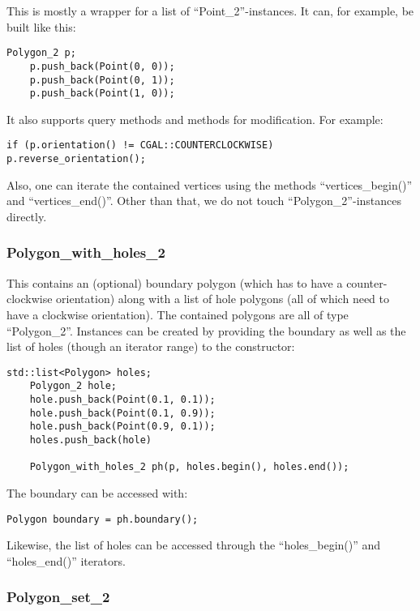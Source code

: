 This is mostly a wrapper for a list of ``Point\_2''-instances. It can, for example, be built like this:

\begin{lstlisting}[numbers=none]
    Polygon_2 p;
    p.push_back(Point(0, 0));
    p.push_back(Point(0, 1));
    p.push_back(Point(1, 0));
\end{lstlisting}

It also supports query methods and methods for modification. For example:

\begin{lstlisting}[numbers=none]
    if (p.orientation() != CGAL::COUNTERCLOCKWISE) p.reverse_orientation();
\end{lstlisting}

Also, one can iterate the contained vertices using the methods ``vertices\_begin()'' and ``vertices\_end()''.
Other than that, we do not touch ``Polygon\_2''-instances directly.

\subsubsection{Polygon\_with\_holes\_2}

This contains an (optional) boundary polygon (which has to have a counter-clockwise orientation) along with a list
of hole polygons (all of which need to have a clockwise orientation). The contained polygons are all of type
``Polygon\_2''. Instances can be created by providing the boundary as well as the list of holes (though an iterator
range) to the constructor:

\begin{lstlisting}[numbers=none]
    std::list<Polygon> holes;
    Polygon_2 hole;
    hole.push_back(Point(0.1, 0.1));
    hole.push_back(Point(0.1, 0.9));
    hole.push_back(Point(0.9, 0.1));
    holes.push_back(hole)
    
    Polygon_with_holes_2 ph(p, holes.begin(), holes.end());
\end{lstlisting}

The boundary can be accessed with:

\begin{lstlisting}[numbers=none]
    Polygon boundary = ph.boundary();
\end{lstlisting}

Likewise, the list of holes can be accessed through the ``holes\_begin()'' and ``holes\_end()'' iterators.

\subsubsection{Polygon\_set\_2}

